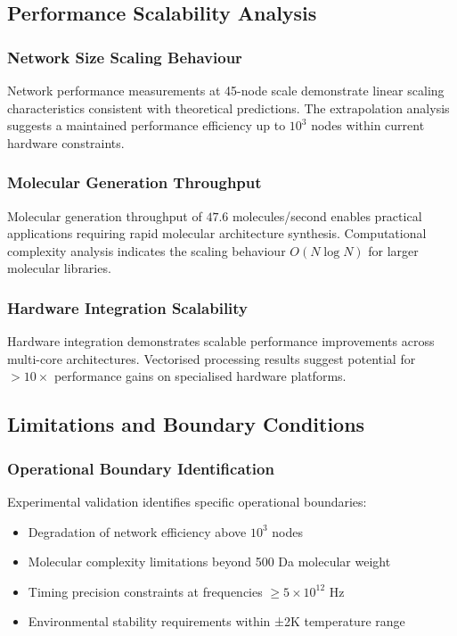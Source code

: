 \documentclass[12pt,a4paper]{article}
\begin{document}
\subsection{Performance Scalability Analysis}

\subsubsection{Network Size Scaling Behaviour}

Network performance measurements at 45-node scale demonstrate linear scaling characteristics consistent with theoretical predictions. The extrapolation analysis suggests a maintained performance efficiency up to $10^3$ nodes within current hardware constraints.

\subsubsection{Molecular Generation Throughput}

Molecular generation throughput of $47.6$ molecules/second enables practical applications requiring rapid molecular architecture synthesis. Computational complexity analysis indicates the scaling behaviour $O(N \log N)$ for larger molecular libraries.

\subsubsection{Hardware Integration Scalability}

Hardware integration demonstrates scalable performance improvements across multi-core architectures. Vectorised processing results suggest potential for $> 10 \times$ performance gains on specialised hardware platforms.

\subsection{Limitations and Boundary Conditions}

\subsubsection{Operational Boundary Identification}

Experimental validation identifies specific operational boundaries:

\begin{itemize}
\item Degradation of network efficiency above $10^{3}$ nodes
\item Molecular complexity limitations beyond 500 Da molecular weight  
\item Timing precision constraints at frequencies $\ge 5 \times 10^{12}$ Hz
\item Environmental stability requirements within ±2K temperature range
\end{itemize}
\end{document}
